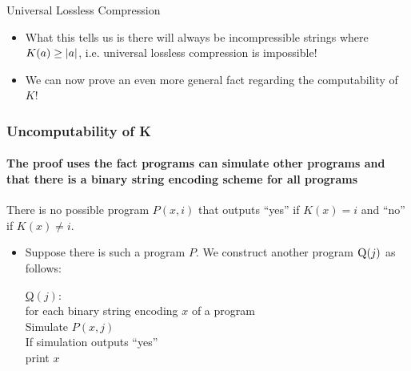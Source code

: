 \documentclass[aspectratio=169]{beamer}
\begin{document}
\begin{frame}{Universal Lossless Compression}
    \begin{itemize}
        \item What this tells us is there will always be incompressible strings where $K(a) \geq \abs{a}$, i.e. universal lossless compression is impossible! \pause
        \item We can now prove an even more general fact regarding the computability of $K$!
    \end{itemize}
\end{frame}

\begin{frame}
  \frametitle{Uncomputability of K}
  \framesubtitle{The proof uses the fact programs can simulate other programs and that there is a binary string encoding scheme for all programs}
  \begin{thrm}
    There is no possible program $P(x, i)$ that outputs ``yes'' if $K(x) = i$ and ``no'' if $K(x) \neq i$.
  \end{thrm}
  \pause
  \begin{pf}
    \begin{itemize}
        \item Suppose there is such a program $P$. We construct another program $\textsc{Q}(j)$ as follows: \pause
        \begin{algo}
        \underline{\textsc{Q}$(j)$}:\+
        \\ for each binary string encoding $x$ of a program \+
        \\  Simulate $P(x, j)$
        \\ If simulation outputs ``yes'' \+
        \\      print $x$  \- \-
        \end{algo}
    \end{itemize}
  \end{pf}
\end{frame}
\end{document}
